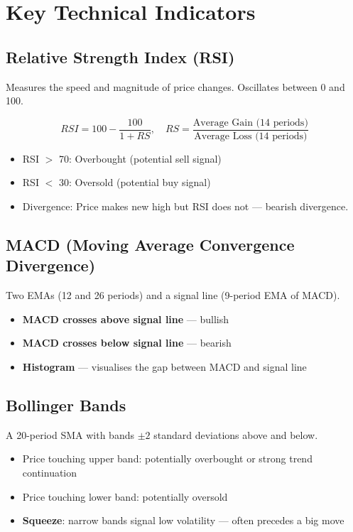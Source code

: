 \section{Key Technical Indicators}

\subsection{Relative Strength Index (RSI)}
Measures the speed and magnitude of price changes. Oscillates between 0 and 100.

\begin{formulabox}
\[
  RSI = 100 - \frac{100}{1 + RS}, \quad RS = \frac{\text{Average Gain (14 periods)}}{\text{Average Loss (14 periods)}}
\]
\end{formulabox}

\begin{itemize}
  \item RSI $>$ 70: Overbought (potential sell signal)
  \item RSI $<$ 30: Oversold (potential buy signal)
  \item Divergence: Price makes new high but RSI does not — bearish divergence.
\end{itemize}

\subsection{MACD (Moving Average Convergence Divergence)}
Two EMAs (12 and 26 periods) and a signal line (9-period EMA of MACD).
\begin{itemize}
  \item \textbf{MACD crosses above signal line} — bullish
  \item \textbf{MACD crosses below signal line} — bearish
  \item \textbf{Histogram} — visualises the gap between MACD and signal line
\end{itemize}

\subsection{Bollinger Bands}
A 20-period SMA with bands $\pm 2$ standard deviations above and below.
\begin{itemize}
  \item Price touching upper band: potentially overbought or strong trend continuation
  \item Price touching lower band: potentially oversold
  \item \textbf{Squeeze}: narrow bands signal low volatility — often precedes a big move
\end{itemize}

